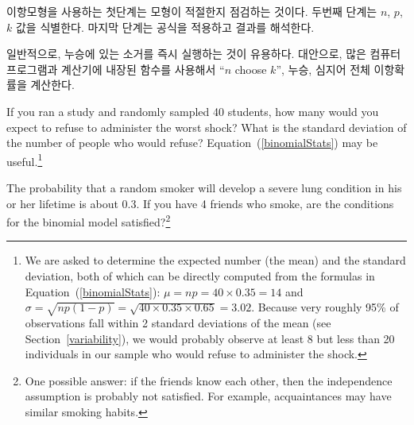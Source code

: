 \begin{tipBox}{
이항모형을 사용하는 첫단계는 모형이 적절한지 점검하는 것이다. 두번째 단계는 $n$, $p$, $k$ 값을 식별한다. 마지막 단계는 공식을 적용하고 결과를 해석한다.}
\end{tipBox}

\begin{tipBox}{
일반적으로, 누승에 있는 소거를 즉시 실행하는 것이 유용하다. 대안으로, 많은 컴퓨터 프로그램과 계산기에 내장된 함수를 사용해서 ``$n$ choose $k$'', 누승, 심지어 전체 이항확률을 계산한다.}
\end{tipBox}

\begin{exercise}
If you ran a study and randomly sampled 40 students, how many would you expect to refuse to administer the worst shock? What is the standard deviation of the number of people who would refuse? Equation~(\ref{binomialStats}) may be useful.\footnote{We are asked to determine the expected number (the mean) and the standard deviation, both of which can be directly computed from the formulas in Equation~(\ref{binomialStats}): $\mu=np = 40\times 0.35 = 14$ and $\sigma = \sqrt{np(1-p)} = \sqrt{40\times 0.35\times 0.65} = 3.02$. Because very roughly 95\% of observations fall within 2 standard deviations of the mean (see Section~\ref{variability}), we would probably observe at least 8 but less than 20 individuals in our sample who would refuse to administer the shock.}
\end{exercise}

\begin{exercise}
The probability that a random smoker will develop a severe lung condition in his or her lifetime is about $0.3$. If you have 4 friends who smoke, are the conditions for the binomial model satisfied?\footnote{One possible answer: if the friends know each other, then the independence assumption is probably not satisfied. For example, acquaintances may have similar smoking habits.}
\end{exercise}

